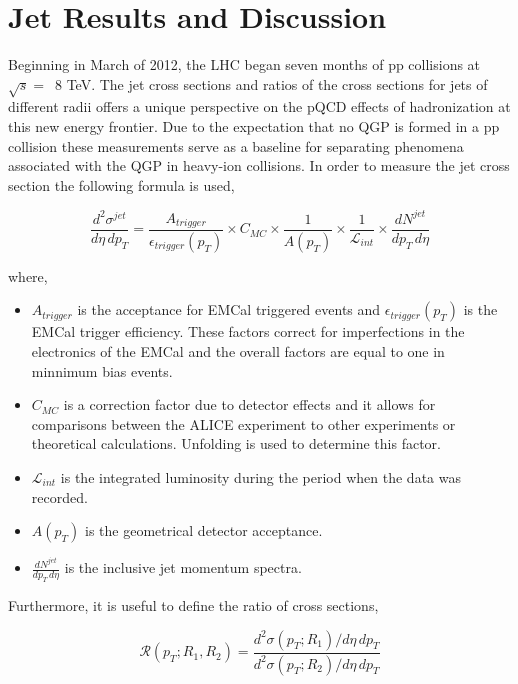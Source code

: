 \chapter{Jet Results and Discussion} \label{ch:analysis}

Beginning in March of 2012, the LHC began seven months of pp collisions at $\sqrt{s} = \,$ 8 TeV.  The jet cross sections and ratios of the cross sections for jets of different radii offers a unique perspective on the pQCD effects of hadronization at this new energy frontier.  Due to the expectation that no QGP is formed in a pp collision these measurements serve as a baseline for separating phenomena associated with the QGP in heavy-ion collisions.  In order to measure the jet cross section the following formula is used,

\begin{equation}
	\frac{d^{2} \sigma^{jet}}{d\eta \, dp_{T}} = \frac{A_{trigger}}{\epsilon_{trigger}(p_{T})} \times C_{MC} \times \frac{1}{A(p_{T}) } \times \frac{1}{\mathscr{L}_{int}} \times \frac{dN^{jet}}{dp_{T} \, d\eta}
\label{eq:xsecdef}
\end{equation}

\noindent
where,

\begin{itemize}
  \item $A_{trigger}$ is the acceptance for EMCal triggered events and $\epsilon_{trigger}(p_{T})$ is the EMCal trigger efficiency.  These factors correct for imperfections in the electronics of the EMCal and the overall factors are equal to one in minnimum bias events.
  \item $C_{MC}$ is a correction factor due to detector effects and it allows for comparisons between the ALICE experiment to other experiments or theoretical calculations.  Unfolding is used to determine this factor.
  \item $\mathscr{L}_{int}$ is the integrated luminosity during the period when the data was recorded.
  \item $A(p_{T})$ is the geometrical detector acceptance.
  \item $\frac{dN^{jet}}{dp_{T} \, d\eta}$ is the inclusive jet momentum spectra.
  
\end{itemize}

\noindent
Furthermore, it is useful to define the ratio of cross sections,

\begin{equation}
\mathscr{R}(p_{T};R_{1},R_{2}) = \frac{d^{2}\sigma(p_{T};R_{1})/d\eta \, dp_{T}}{d^{2}\sigma(p_{T};R_{2})/d\eta \, dp_{T}}
\label{eq:xsecratio}
\end{equation}

